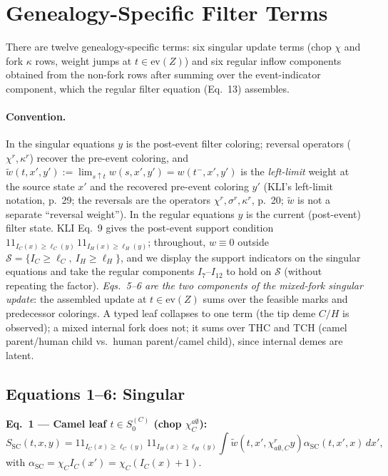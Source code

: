 \documentclass[11pt]{article}
\newcommand{\evZ}{\mathrm{ev}(Z)}
\newcommand{\ind}{1\!\!1}
\newcommand{\rw}{\widetilde{w}}  %
\theoremstyle{plain}
\begin{document}
\section{Genealogy-Specific Filter Terms}
There are twelve genealogy-specific terms: six singular update terms (chop $\chi$ and fork $\kappa$
rows, weight jumps at $t\in\evZ$) and six regular inflow components obtained from the non-fork rows after summing over the event-indicator component, which the
regular filter equation (Eq.~13) assembles.

\paragraph{Convention.} In the singular equations $y$ is the post-event filter coloring; reversal
operators ($\chi^r,\kappa^r$) recover the pre-event coloring, and $\rw(t,x',y'):=\lim_{s\uparrow
t}w(s,x',y')=w(t^-,x',y')$ is the \emph{left-limit} weight at the source state $x'$ and the recovered
pre-event coloring $y'$ (KLI's left-limit notation, p.~29; the reversals are the operators
$\chi^r,\sigma^r,\kappa^r$, p.~20; $\rw$ is not a separate ``reversal weight''). In the regular
equations $y$ is the current (post-event) filter state. KLI Eq.~9 gives the post-event support condition $\ind_{I_C(x)\ge\ell_C(y)}\,\ind_{I_H(x)\ge\ell_H(y)}$; throughout, $w\equiv0$ outside $\mathcal S=\{I_C\ge\ell_C,\ I_H\ge\ell_H\}$, and we
display the support indicators on the singular equations and take the regular components
$I_7$--$I_{12}$ to hold on $\mathcal S$ (without repeating the factor). \emph{Eqs.~5--6 are the two
components of the mixed-fork singular update}: the
assembled update at $t\in\evZ$ sums over the feasible marks and predecessor colorings. A typed leaf
collapses to one term (the tip deme $C/H$ is observed); a mixed internal fork does not; it sums over
THC and TCH (camel parent/human child vs.\ human parent/camel child), since internal demes are latent.

\subsection{Equations 1--6: Singular}
\textbf{Eq.~1 --- Camel leaf $t\in S^{(C)}_0$ (chop $\chi^{a\emptyset}_C$):}
\begin{equation}
S_{\mathrm{SC}}(t,x,y)=\ind_{I_C(x)\ge\ell_C(y)}\,\ind_{I_H(x)\ge\ell_H(y)}\int \rw\!\left(t,x',\chi^r_{a\emptyset,C}y\right)\alpha_{\mathrm{SC}}(t,x',x)\,
dx',
\end{equation}
with $\alpha_{\mathrm{SC}}=\chi_C I_C(x')=\chi_C(I_C(x)+1)$.
\end{document}
